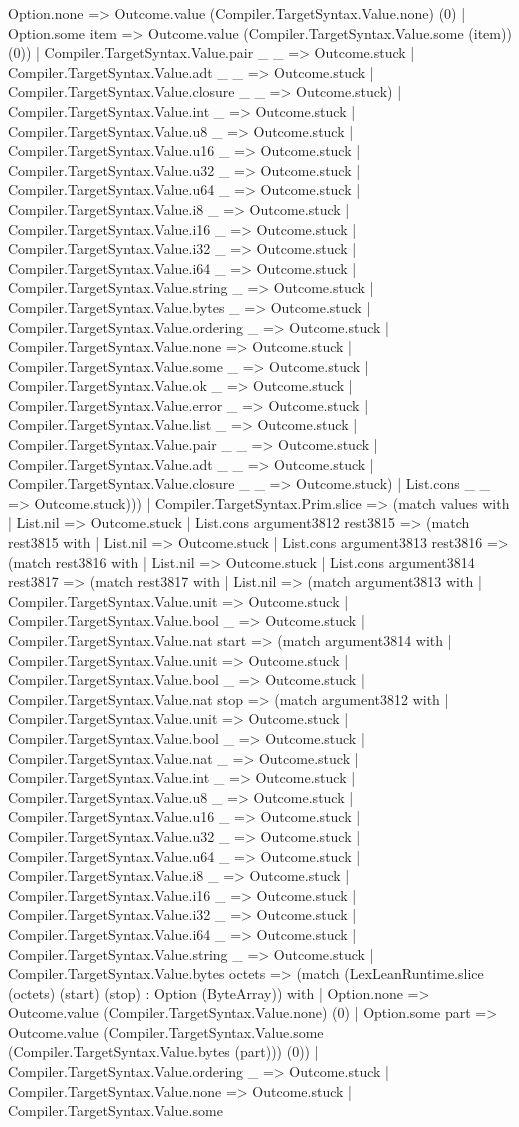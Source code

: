 \documentclass[11pt]{article}
\begin{document}
Option.none => Outcome.value (Compiler.TargetSyntax.Value.none) (0) | Option.some item => Outcome.value (Compiler.TargetSyntax.Value.some (item)) (0)) | Compiler.TargetSyntax.Value.pair \_ \_ => Outcome.stuck | Compiler.TargetSyntax.Value.adt \_ \_ => Outcome.stuck | Compiler.TargetSyntax.Value.closure \_ \_ => Outcome.stuck) | Compiler.TargetSyntax.Value.int \_ => Outcome.stuck | Compiler.TargetSyntax.Value.u8 \_ => Outcome.stuck | Compiler.TargetSyntax.Value.u16 \_ => Outcome.stuck | Compiler.TargetSyntax.Value.u32 \_ => Outcome.stuck | Compiler.TargetSyntax.Value.u64 \_ => Outcome.stuck | Compiler.TargetSyntax.Value.i8 \_ => Outcome.stuck | Compiler.TargetSyntax.Value.i16 \_ => Outcome.stuck | Compiler.TargetSyntax.Value.i32 \_ => Outcome.stuck | Compiler.TargetSyntax.Value.i64 \_ => Outcome.stuck | Compiler.TargetSyntax.Value.string \_ => Outcome.stuck | Compiler.TargetSyntax.Value.bytes \_ => Outcome.stuck | Compiler.TargetSyntax.Value.ordering \_ => Outcome.stuck | Compiler.TargetSyntax.Value.none => Outcome.stuck | Compiler.TargetSyntax.Value.some \_ => Outcome.stuck | Compiler.TargetSyntax.Value.ok \_ => Outcome.stuck | Compiler.TargetSyntax.Value.error \_ => Outcome.stuck | Compiler.TargetSyntax.Value.list \_ => Outcome.stuck | Compiler.TargetSyntax.Value.pair \_ \_ => Outcome.stuck | Compiler.TargetSyntax.Value.adt \_ \_ => Outcome.stuck | Compiler.TargetSyntax.Value.closure \_ \_ => Outcome.stuck) | List.cons \_ \_ => Outcome.stuck))) | Compiler.TargetSyntax.Prim.slice => (match values with | List.nil => Outcome.stuck | List.cons argument3812 rest3815 => (match rest3815 with | List.nil => Outcome.stuck | List.cons argument3813 rest3816 => (match rest3816 with | List.nil => Outcome.stuck | List.cons argument3814 rest3817 => (match rest3817 with | List.nil => (match argument3813 with | Compiler.TargetSyntax.Value.unit => Outcome.stuck | Compiler.TargetSyntax.Value.bool \_ => Outcome.stuck | Compiler.TargetSyntax.Value.nat start => (match argument3814 with | Compiler.TargetSyntax.Value.unit => Outcome.stuck | Compiler.TargetSyntax.Value.bool \_ => Outcome.stuck | Compiler.TargetSyntax.Value.nat stop => (match argument3812 with | Compiler.TargetSyntax.Value.unit => Outcome.stuck | Compiler.TargetSyntax.Value.bool \_ => Outcome.stuck | Compiler.TargetSyntax.Value.nat \_ => Outcome.stuck | Compiler.TargetSyntax.Value.int \_ => Outcome.stuck | Compiler.TargetSyntax.Value.u8 \_ => Outcome.stuck | Compiler.TargetSyntax.Value.u16 \_ => Outcome.stuck | Compiler.TargetSyntax.Value.u32 \_ => Outcome.stuck | Compiler.TargetSyntax.Value.u64 \_ => Outcome.stuck | Compiler.TargetSyntax.Value.i8 \_ => Outcome.stuck | Compiler.TargetSyntax.Value.i16 \_ => Outcome.stuck | Compiler.TargetSyntax.Value.i32 \_ => Outcome.stuck | Compiler.TargetSyntax.Value.i64 \_ => Outcome.stuck | Compiler.TargetSyntax.Value.string \_ => Outcome.stuck | Compiler.TargetSyntax.Value.bytes octets => (match (LexLeanRuntime.slice (octets) (start) (stop) : Option (ByteArray)) with | Option.none => Outcome.value (Compiler.TargetSyntax.Value.none) (0) | Option.some part => Outcome.value (Compiler.TargetSyntax.Value.some (Compiler.TargetSyntax.Value.bytes (part))) (0)) | Compiler.TargetSyntax.Value.ordering \_ => Outcome.stuck | Compiler.TargetSyntax.Value.none => Outcome.stuck | Compiler.TargetSyntax.Value.some 
\end{document}
